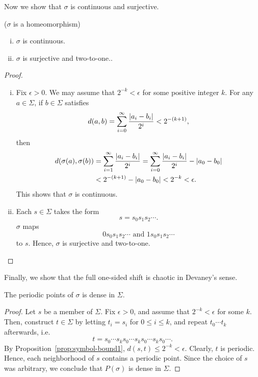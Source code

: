 \documentclass[10pt,twoside]{book}
\begin{document}
Now we show that $\sigma$ is continuous and surjective.
\begin{proposition}
  ($\sigma$ is a homeomorphism)
  \begin{enumerate}[(i)]
    \item $\sigma$ is continuous.
    \item  $\sigma$ is surjective and two-to-one..
  \end{enumerate}
  \begin{proof}
    \begin{enumerate}[(i)]
      \item 
        Fix $\epsilon > 0$.
        We may assume that $2^{-k} < \epsilon$ for some positive integer $k$.
        For any $a \in \Sigma$, if $b \in \Sigma$ satisfies
        \begin{equation*}
          d(a,b) = \sum\limits_{i=0}^{\infty} \frac{\left | a_i - b_i \right |}{2^i} < 2^{-(k+1)},
        \end{equation*}
        then 
        \begin{align*}
          d(\sigma(a), \sigma(b)) 
          &= \sum\limits_{i=1}^{\infty} \frac{\left | a_i - b_i \right |}{2^i} 
          = \sum\limits_{i=0}^{\infty} \frac{\left | a_i - b_i \right |}{2^i} - \left | a_0 - b_0 \right |  \\
          &< 2^{-(k+1)} - \left | a_0 - b_0 \right |
          < 2^{-k}
          < \epsilon.
        \end{align*}
        This shows that $\sigma$ is continuous.
      \item  
        Each $s \in \Sigma$ takes the form
        \begin{equation*}
          s = s_0s_1s_2 \cdots.
        \end{equation*}
        $\sigma$ maps
        \begin{equation*}
          0 s_0s_1s_2 \cdots \mbox{ and } 1 s_0s_1s_2 \cdots
        \end{equation*}
        to $s$.
        Hence, $\sigma$ is surjective and two-to-one.
    \end{enumerate}
  \end{proof}
  \label{prop:sigma-cont}
\end{proposition}
Finally, we show that the full one-sided shift is chaotic in Devaney's sense.
\begin{proposition}
  The periodic points of $\sigma$ is dense in $\Sigma$.
  \begin{proof}
    Let $s$ be a member of $\Sigma$.
    Fix $\epsilon > 0$, and assume that $2^{-k} < \epsilon$ for some $k$.
    Then, construct $t \in \Sigma$ by letting $t_i = s_i$ for $0 \leq i \leq k$, and repeat $t_0 \cdots t_k$ afterwards, i.e.
    \begin{equation*}
      t = s_0 \cdots s_k s_0 \cdots s_k s_0 \cdots s_k s_0 \cdots.
    \end{equation*}
    By Proposition~\ref{prop:symbol-bound1}, $d(s,t) \leq 2^{-k} < \epsilon$.
    Clearly, $t$ is periodic.
    Hence, each neighborhood of $s$ contains a periodic point.
    Since the choice of $s$ was arbitrary, we conclude that $P(\sigma)$ is dense in $\Sigma$.
  \end{proof}
\end{proposition}
\end{document}
